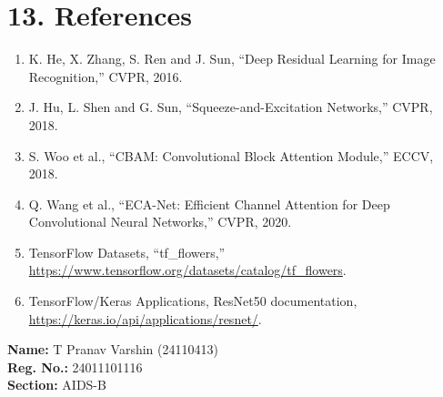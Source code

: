 \documentclass[10pt]{article}
\begin{document}
\section*{13. References}
\begin{enumerate}
\item K. He, X. Zhang, S. Ren and J. Sun, ``Deep Residual Learning for Image Recognition,'' CVPR, 2016.
\item J. Hu, L. Shen and G. Sun, ``Squeeze-and-Excitation Networks,'' CVPR, 2018.
\item S. Woo et al., ``CBAM: Convolutional Block Attention Module,'' ECCV, 2018.
\item Q. Wang et al., ``ECA-Net: Efficient Channel Attention for Deep Convolutional Neural Networks,'' CVPR, 2020.
\item TensorFlow Datasets, ``tf\_flowers,'' \url{https://www.tensorflow.org/datasets/catalog/tf_flowers}.
\item TensorFlow/Keras Applications, ResNet50 documentation, \url{https://keras.io/api/applications/resnet/}.
\end{enumerate}

\vspace{4mm}
\textbf{Name:} T Pranav Varshin (24110413)\\
\textbf{Reg. No.:} 24011101116\\
\textbf{Section:} AIDS-B
\end{document}
